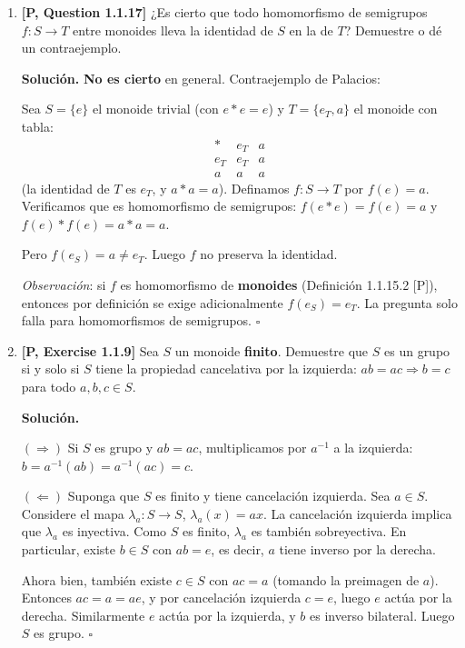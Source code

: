 \begin{enumerate}[label=\textbf{2.\arabic*.}]
\item \textbf{[P, Question 1.1.17]} ¿Es cierto que todo homomorfismo de
semigrupos \(f:S \to T\) entre monoides lleva la identidad de \(S\) en la de \(T\)?
Demuestre o dé un contraejemplo.

\textbf{Solución.}
\textbf{No es cierto} en general. Contraejemplo de Palacios:

Sea \(S = \{e\}\) el monoide trivial (con \(e*e=e\)) y
\(T = \{e_T, a\}\) el monoide con tabla:
\[
\begin{array}{c|cc}
    * & e_T & a \\ \hline
    e_T & e_T & a \\
    a   & a   & a
\end{array}
\]
(la identidad de \(T\) es \(e_T\), y \(a*a=a\)).
Definamos \(f:S\to T\) por \(f(e) = a\). Verificamos que es homomorfismo de
semigrupos: \(f(e*e)=f(e)=a\) y \(f(e)*f(e)=a*a=a\). \checkmark

Pero \(f(e_S) = a \neq e_T\). Luego \(f\) no preserva la identidad.

\textit{Observación}: si \(f\) es homomorfismo de \textbf{monoides} (Definición
1.1.15.2 [P]), entonces por definición se exige adicionalmente \(f(e_S)=e_T\).
La pregunta solo falla para homomorfismos de semigrupos. \hfill\(\square\)

\item \textbf{[P, Exercise 1.1.9]} Sea \(S\) un monoide \textbf{finito}.
Demuestre que \(S\) es un grupo si y solo si \(S\) tiene la propiedad
cancelativa por la izquierda: \(ab = ac \Rightarrow b = c\) para todo
\(a, b, c \in S\).

\textbf{Solución.}

\((\Rightarrow)\) Si \(S\) es grupo y \(ab=ac\), multiplicamos por \(a^{-1}\) a la
izquierda: \(b = a^{-1}(ab) = a^{-1}(ac) = c\).

\((\Leftarrow)\) Suponga que \(S\) es finito y tiene cancelación izquierda.
Sea \(a \in S\). Considere el mapa \(\lambda_a : S \to S\), \(\lambda_a(x) = ax\).
La cancelación izquierda implica que \(\lambda_a\) es inyectiva.
Como \(S\) es finito, \(\lambda_a\) es también sobreyectiva. En particular,
existe \(b \in S\) con \(ab = e\), es decir, \(a\) tiene inverso por la derecha.

Ahora bien, también existe \(c \in S\) con \(ac = a\) (tomando la preimagen de
\(a\)). Entonces \(ac = a = ae\), y por cancelación izquierda \(c = e\), luego
\(e\) actúa por la derecha. Similarmente \(e\) actúa por la izquierda, y \(b\) es
inverso bilateral. Luego \(S\) es grupo. \hfill\(\square\)


\end{enumerate}

